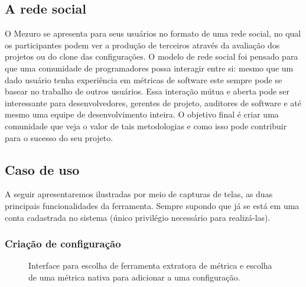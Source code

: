\documentclass[12pt]{article}
\begin{document}
  \subsection{A rede social}\label{sec:user-potencial}
  O Mezuro se apresenta para seus usuários no formato de uma rede social, no qual os participantes podem ver a produção de terceiros através da avaliação dos projetos ou do clone das configurações. O modelo de rede social foi pensado para que uma comunidade de programadores possa interagir entre si: mesmo que um dado usuário tenha experiência em métricas de software este sempre pode se basear no trabalho de outros usuários. Essa interação mútua e aberta pode ser interessante para desenvolvedores, gerentes de projeto, auditores de software e até mesmo uma equipe de desenvolvimento inteira. O objetivo final é criar uma comunidade que veja o valor de tais metodologias e como isso pode contribuir para o sucesso do seu projeto.

  \subsection{Caso de uso}
  A seguir apresentaremos ilustradas por meio de capturas de telas, as duas principais funcionalidades da ferramenta. Sempre supondo que já se está em uma conta cadastrada no sistema (único privilégio necessário para realizá-las).

    \subsubsection{Criação de configuração}
    \begin{figure}[ht]
      \centering
      \caption{Interface para escolha de ferramenta extratora de métrica e escolha de uma métrica nativa para adicionar a uma configuração.}
      \label{fig:choose-metric}
    \end{figure}
\end{document}
